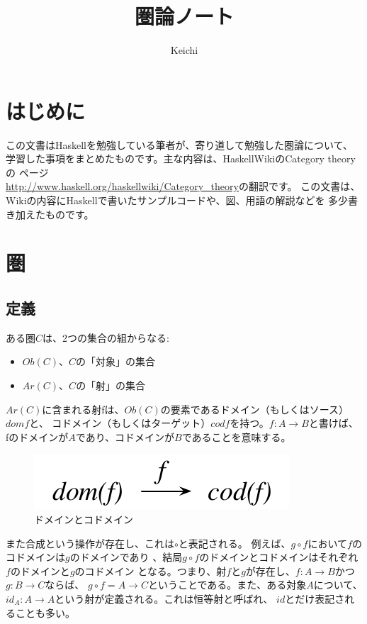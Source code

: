 \documentclass{jsarticle}
\begin{document}
\title{圏論ノート}
\author{Keichi}
\maketitle

\section{はじめに}
この文書はHaskellを勉強している筆者が、寄り道して勉強した圏論について、
学習した事項をまとめたものです。主な内容は、HaskellWikiのCategory theoryの
ページ\\\url{http://www.haskell.org/haskellwiki/Category_theory}の翻訳です。
この文書は、Wikiの内容にHaskellで書いたサンプルコードや、図、用語の解説などを
多少書き加えたものです。

\section{圏}

\subsection{定義}
ある圏$C$は、2つの集合の組からなる:

\begin{itemize}
    \item $Ob(C)$、$C$の「対象」の集合
    \item $Ar(C)$、$C$の「射」の集合
\end{itemize}

$Ar(C)$に含まれる射fは、$Ob(C)$の要素であるドメイン（もしくはソース）$dom f$と、
コドメイン（もしくはターゲット）$cod f$を持つ。$f:A \to B$と書けば、
fのドメインが$A$であり、コドメインが$B$であることを意味する。

\begin{figure}[htbp]
    \centering
    \includegraphics{diag_dom.pdf}
    \caption{ドメインとコドメイン}
\end{figure}

また合成という操作が存在し、これは$\circ$と表記される。
例えば、$g \circ f$において$f$のコドメインは$g$のドメインであり
、結局$g \circ f$のドメインとコドメインはそれぞれ$f$のドメインと$g$のコドメイン
となる。つまり、射$f$と$g$が存在し、$f:A \to B$かつ$g:B \to C$ならば、
$g \circ f = A \to C$ということである。また、ある対象$A$について、
$id_A: A \to A$という射が定義される。これは恒等射と呼ばれ、
$id$とだけ表記されることも多い。
\end{document}
